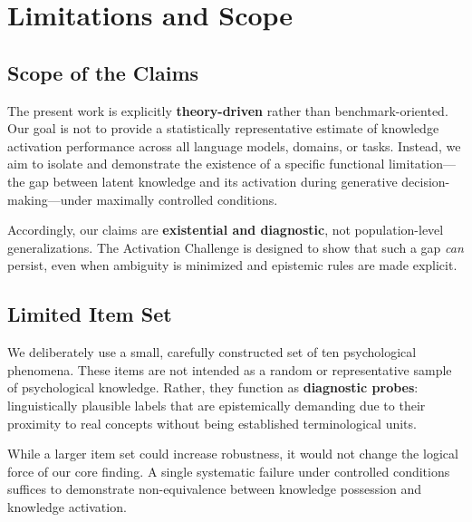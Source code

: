 
\section{Limitations and Scope}

\subsection{Scope of the Claims}

The present work is explicitly \textbf{theory-driven} rather than benchmark-oriented. Our goal is not to provide a statistically representative estimate of knowledge activation performance across all language models, domains, or tasks. Instead, we aim to isolate and demonstrate the existence of a specific functional limitation---the gap between latent knowledge and its activation during generative decision-making---under maximally controlled conditions.

Accordingly, our claims are \textbf{existential and diagnostic}, not population-level generalizations. The Activation Challenge is designed to show that such a gap \emph{can} persist, even when ambiguity is minimized and epistemic rules are made explicit.


\subsection{Limited Item Set}

We deliberately use a small, carefully constructed set of ten psychological phenomena. These items are not intended as a random or representative sample of psychological knowledge. Rather, they function as \textbf{diagnostic probes}: linguistically plausible labels that are epistemically demanding due to their proximity to real concepts without being established terminological units.

While a larger item set could increase robustness, it would not change the logical force of our core finding. A single systematic failure under controlled conditions suffices to demonstrate non-equivalence between knowledge possession and knowledge activation.


